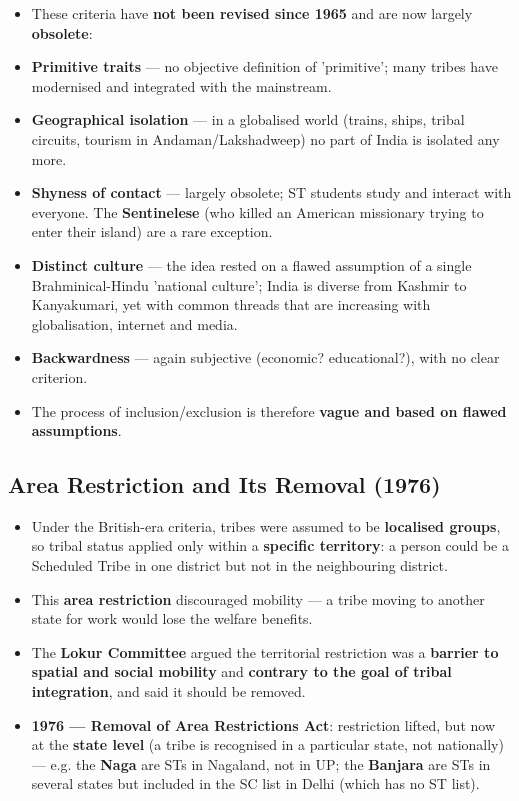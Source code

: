 \begin{CriticalPoint}
\begin{itemize}
\item These criteria have \textbf{not been revised since 1965} and are now largely \textbf{obsolete}:
\item \textbf{Primitive traits} --- no objective definition of 'primitive'; many tribes have modernised and integrated with the mainstream.
\item \textbf{Geographical isolation} --- in a globalised world (trains, ships, tribal circuits, tourism in Andaman/Lakshadweep) no part of India is isolated any more.
\item \textbf{Shyness of contact} --- largely obsolete; ST students study and interact with everyone. The \textbf{Sentinelese} (who killed an American missionary trying to enter their island) are a rare exception.
\item \textbf{Distinct culture} --- the idea rested on a flawed assumption of a single Brahminical-Hindu 'national culture'; India is diverse from Kashmir to Kanyakumari, yet with common threads that are increasing with globalisation, internet and media.
\item \textbf{Backwardness} --- again subjective (economic? educational?), with no clear criterion.
\item The process of inclusion/exclusion is therefore \textbf{vague and based on flawed assumptions}.
\end{itemize}
\end{CriticalPoint}

\subsection{Area Restriction and Its Removal (1976)}

\begin{KeyConcept}
\begin{itemize}
\item Under the British-era criteria, tribes were assumed to be \textbf{localised groups}, so tribal status applied only within a \textbf{specific territory}: a person could be a Scheduled Tribe in one district but not in the neighbouring district.
\item This \textbf{area restriction} discouraged mobility --- a tribe moving to another state for work would lose the welfare benefits.
\item The \textbf{Lokur Committee} argued the territorial restriction was a \textbf{barrier to spatial and social mobility} and \textbf{contrary to the goal of tribal integration}, and said it should be removed.
\item \textbf{1976 --- Removal of Area Restrictions Act}: restriction lifted, but now at the \textbf{state level} (a tribe is recognised in a particular state, not nationally) --- e.g. the \textbf{Naga} are STs in Nagaland, not in UP; the \textbf{Banjara} are STs in several states but included in the SC list in Delhi (which has no ST list).
\end{itemize}
\end{KeyConcept}

